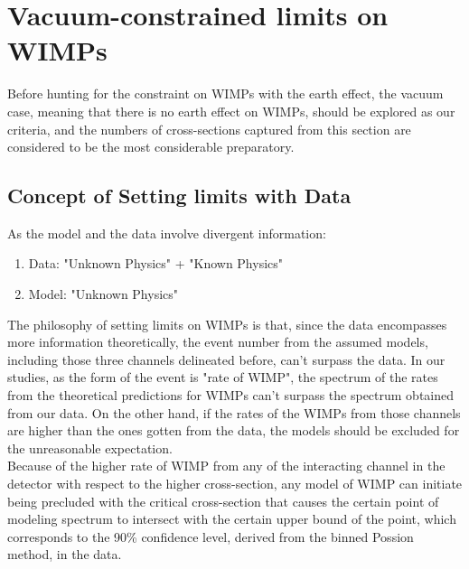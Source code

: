 \section{Vacuum-constrained limits on WIMPs}
Before hunting for the constraint on WIMPs with the earth effect, the vacuum case, meaning that there is no earth effect on WIMPs, should be explored as our criteria, and the numbers of cross-sections captured from this section are considered to be the most considerable preparatory.\\  
\subsection{Concept of Setting limits with Data}
As the model and the data involve divergent information:\\
\begin{enumerate}
\item  Data: "Unknown Physics" + "Known Physics"
\item  Model: "Unknown Physics"
\end{enumerate}
The philosophy of setting limits on WIMPs is that, since the data encompasses more information theoretically, the event number from the assumed models, including those three channels delineated before, can't surpass the data. In our studies, as the form of the event is "rate of WIMP", the spectrum of the rates from the theoretical predictions for WIMPs can't surpass the spectrum obtained from our data. On the other hand, if the rates of the WIMPs from those channels are higher than the ones gotten from the data, the models should be excluded for the unreasonable expectation.\\

Because of the higher rate of WIMP from any of the interacting channel in the detector with respect to the higher cross-section, any model of WIMP can initiate being precluded with the critical cross-section that causes the certain point of modeling spectrum to intersect with the certain upper bound of the point, which corresponds to the 90\% confidence level, derived from the binned Possion method, in the data.

